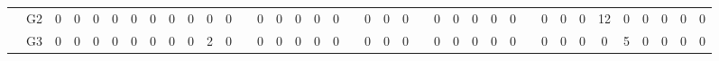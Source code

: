\documentclass[12pt]{article}
\begin{document}
\begin{table}[!ht]
{\begin{tabular}{cccccccccccccccccccccccccccccccccccccc}
\multicolumn{1}{c|}{}                       & \multicolumn{1}{c|}{G2}  & \multicolumn{1}{c|}{0}  & \multicolumn{1}{c|}{0}  & \multicolumn{1}{c|}{0}  & \multicolumn{1}{c|}{0}  & \multicolumn{1}{c|}{0}  & \multicolumn{1}{c|}{0}  & \multicolumn{1}{c|}{0}  & \multicolumn{1}{c|}{0}  & \multicolumn{1}{c|}{0}  & \multicolumn{1}{c|}{0}  & \multicolumn{1}{c|}{}                     & \multicolumn{1}{c|}{0}  & \multicolumn{1}{c|}{0}  & \multicolumn{1}{c|}{0}  & \multicolumn{1}{c|}{0}  & \multicolumn{1}{c|}{0}  & \multicolumn{1}{c|}{}                     & \multicolumn{1}{c|}{0}  & \multicolumn{1}{c|}{0}  & \multicolumn{1}{c|}{0}  & \multicolumn{1}{c|}{}                     & \multicolumn{1}{c|}{0}  & \multicolumn{1}{c|}{0}  & \multicolumn{1}{c|}{0}  & \multicolumn{1}{c|}{0}  & \multicolumn{1}{c|}{0}  & \multicolumn{1}{c|}{}                     & \multicolumn{1}{c|}{0}  & \multicolumn{1}{c|}{0}  & \multicolumn{1}{c|}{0}  & \multicolumn{1}{c|}{12} & \multicolumn{1}{c|}{0}  & \multicolumn{1}{c|}{0}  & \multicolumn{1}{c|}{0}  & \multicolumn{1}{c|}{0}  & \multicolumn{1}{c|}{0}  \\ \cline{2-12} \cline{14-18} \cline{20-22} \cline{24-28} \cline{30-38} 
\multicolumn{1}{c|}{}                       & \multicolumn{1}{c|}{G3}  & \multicolumn{1}{c|}{0}  & \multicolumn{1}{c|}{0}  & \multicolumn{1}{c|}{0}  & \multicolumn{1}{c|}{0}  & \multicolumn{1}{c|}{0}  & \multicolumn{1}{c|}{0}  & \multicolumn{1}{c|}{0}  & \multicolumn{1}{c|}{0}  & \multicolumn{1}{c|}{2}  & \multicolumn{1}{c|}{0}  & \multicolumn{1}{c|}{}                     & \multicolumn{1}{c|}{0}  & \multicolumn{1}{c|}{0}  & \multicolumn{1}{c|}{0}  & \multicolumn{1}{c|}{0}  & \multicolumn{1}{c|}{0}  & \multicolumn{1}{c|}{}                     & \multicolumn{1}{c|}{0}  & \multicolumn{1}{c|}{0}  & \multicolumn{1}{c|}{0}  & \multicolumn{1}{c|}{}                     & \multicolumn{1}{c|}{0}  & \multicolumn{1}{c|}{0}  & \multicolumn{1}{c|}{0}  & \multicolumn{1}{c|}{0}  & \multicolumn{1}{c|}{0}  & \multicolumn{1}{c|}{}                     & \multicolumn{1}{c|}{0}  & \multicolumn{1}{c|}{0}  & \multicolumn{1}{c|}{0}  & \multicolumn{1}{c|}{0}  & \multicolumn{1}{c|}{5}  & \multicolumn{1}{c|}{0}  & \multicolumn{1}{c|}{0}  & \multicolumn{1}{c|}{0}  & \multicolumn{1}{c|}{0}  \\ \cline{2-12} \cline{14-18} \cline{20-22} \cline{24-28} \cline{30-38} 

\end{tabular}}
\end{table}
\end{document}
